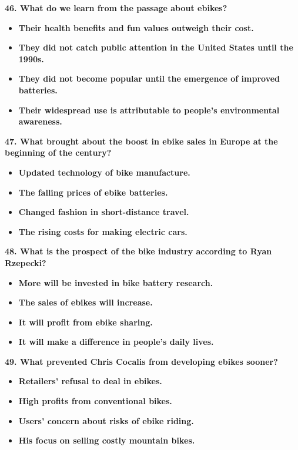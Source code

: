 \documentclass[UTF8,11pt]{ctexart}
\begin{document}
\textbf{46. What do we learn from the passage about ebikes?}


\begin{itemize}[leftmargin=2em,itemsep=.2em,topsep=.4em]\item[A.] \textbf{Their health benefits and fun values outweigh their cost.}
\item[B.] \textbf{They did not catch public attention in the United States until the 1990s.}
\item[C.] \textbf{They did not become popular until the emergence of improved batteries.}
\item[D.] \textbf{Their widespread use is attributable to people's environmental awareness.}
\end{itemize}

\textbf{47. What brought about the boost in ebike sales in Europe at the beginning of the century?}


\begin{itemize}[leftmargin=2em,itemsep=.2em,topsep=.4em]\item[A.] \textbf{Updated technology of bike manufacture.}
\item[B.] \textbf{The falling prices of ebike batteries.}
\item[C.] \textbf{Changed fashion in short-distance travel.}
\item[D.] \textbf{The rising costs for making electric cars.}
\end{itemize}

\textbf{48. What is the prospect of the bike industry according to Ryan Rzepecki?}


\begin{itemize}[leftmargin=2em,itemsep=.2em,topsep=.4em]\item[A.] \textbf{More will be invested in bike battery research.}
\item[B.] \textbf{The sales of ebikes will increase.}
\item[C.] \textbf{It will profit from ebike sharing.}
\item[D.] \textbf{It will make a difference in people's daily lives.}
\end{itemize}

\textbf{49. What prevented Chris Cocalis from developing ebikes sooner?}


\begin{itemize}[leftmargin=2em,itemsep=.2em,topsep=.4em]\item[A.] \textbf{Retailers' refusal to deal in ebikes.}
\item[B.] \textbf{High profits from conventional bikes.}
\item[C.] \textbf{Users' concern about risks of ebike riding.}
\item[D.] \textbf{His focus on selling costly mountain bikes.}
\end{itemize}
\end{document}
